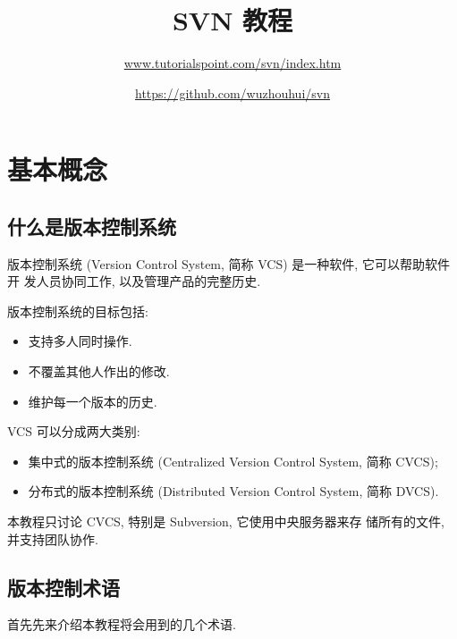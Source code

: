 \documentclass[nofonts, oneside]{ctexbook}
\title{SVN 教程}
\author{\url{www.tutorialspoint.com/svn/index.htm} \and
	\url{https://github.com/wuzhouhui/svn}}
\begin{document}
\maketitle

\chapter{基本概念}
\label{chap:basic_concepts}

\section{什么是版本控制系统}
\label{sec:what_is_version_control_system}

版本控制系统 (Version Control System, 简称 VCS) 是一种软件, 它可以帮助软件开
发人员协同工作, 以及管理产品的完整历史.

版本控制系统的目标包括:
\begin{itemize}
  \item 支持多人同时操作.
  \item 不覆盖其他人作出的修改.
  \item 维护每一个版本的历史.
\end{itemize}

VCS 可以分成两大类别:
\begin{itemize}
  \item 集中式的版本控制系统 (Centralized Version Control System, 简称 CVCS);
  \item 分布式的版本控制系统 (Distributed Version Control System, 简称 DVCS).
\end{itemize}

本教程只讨论 CVCS, 特别是 Subversion, 它使用中央服务器来存
储所有的文件, 并支持团队协作.

\section{版本控制术语}
\label{sec:version_control_terminologies}

首先先来介绍本教程将会用到的几个术语.
\end{document}
